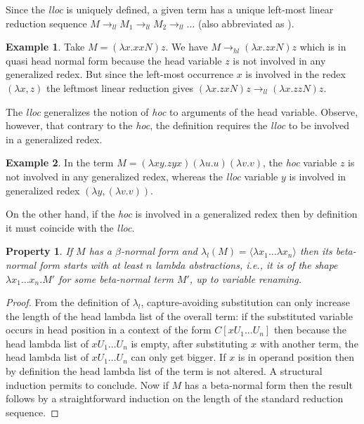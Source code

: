 \documentclass{elsarticle}
\makeatletter
\theoremstyle{plain}
\newtheorem{property}[theorem]{Property}
\theoremstyle{definition}
\newtheorem{example}{Example}[section]
\theoremstyle{remark}
\renewcommand\ie{{\it i.e.\@\xspace}}
\newcommand{\hlred}{\rightarrow_{hl}}
\newcommand{\llred}{\rightarrow_{ll}}
\makeatother
\begin{document}
Since the \emph{lloc} is uniquely defined, a given term has a unique left-most linear reduction sequence $M \llred M_1 \llred M_2 \llred \ldots$ (also abbreviated as ).

\begin{example}
Take $M = (\lambda x. x x N) z$. We have $M \hlred (\lambda x. z x N) z$ which is in quasi head normal form because the head variable $z$ is not involved in any generalized redex.
But since the left-most occurrence $x$ is involved in the redex $(\lambda x, z)$ the leftmost linear reduction gives $(\lambda x. z x N) z \llred (\lambda x. z z N) z$.
\end{example}

The \emph{lloc} generalizes the notion of \emph{hoc} to arguments of the head variable. Observe, however, that contrary to the \emph{hoc}, the definition requires the \emph{lloc} to be involved in a generalized redex.
\begin{example}In the term $M = (\lambda x y . z y x) (\lambda u . u) (\lambda v . v)$, the \emph{hoc} variable $z$ is not involved in any generalized redex, whereas the \emph{lloc} variable $y$ is involved in generalized redex $(\lambda y, (\lambda v.v))$.
\end{example}
On the other hand, if the \emph{hoc} is involved in a generalized redex then by definition it must coincide with the \emph{lloc}.

\begin{property}
If $M$ has a $\beta$-normal form and $\lambda_l(M) = \langle \lambda x_1 \ldots \lambda x_n \rangle$ then its beta-normal form starts with at least $n$ lambda abstractions, \ie, it is of the shape $\lambda x_1 \ldots x_n . M'$ for some beta-normal term $M'$, up to variable renaming.
\end{property}
\begin{proof}
From the definition of $\lambda_l$, capture-avoiding substitution can only increase the length of the head lambda list of the overall term: if the substituted variable occurs in head position in a context of the form $C[x U_1 \ldots U_n]$ then because the head lambda list of $x U_1 \ldots U_n$ is empty, after substituting $x$ with another term, the head lambda list of $x U_1 \ldots U_n$ can only get bigger. If $x$ is in operand position then by definition the head lambda list of the term is not altered. A structural induction permits to conclude.
Now if $M$ has a beta-normal form then the result follows by a straightforward induction on the length of the standard reduction sequence.
\end{proof}
\end{document}

